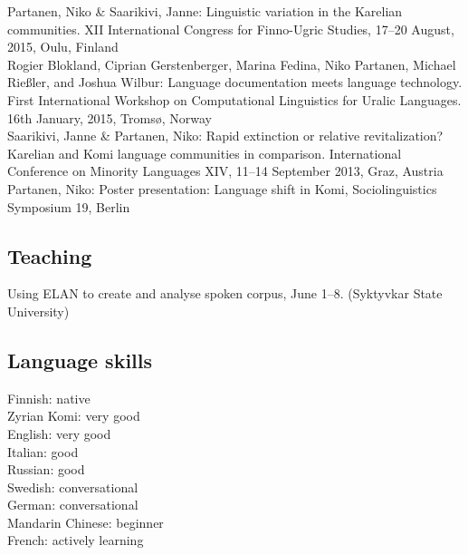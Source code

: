 \documentclass[11pt, a4paper]{article}
\newcommand{\years}[1]{\marginnote{\scriptsize #1}} %
\begin{document}
\years{2015} Partanen, Niko \& Saarikivi, Janne: Linguistic variation in the Karelian communities. XII International Congress for Finno-Ugric Studies, 17–20 August, 2015, Oulu, Finland\\

\years{2014} Rogier Blokland, Ciprian Gerstenberger, Marina Fedina, Niko Partanen, Michael Rießler, and Joshua Wilbur: Language documentation meets language technology. First International Workshop on Computational Linguistics for Uralic Languages. 16th January, 2015, Tromsø, Norway\\

\years{2013} Saarikivi, Janne \& Partanen, Niko: Rapid extinction or relative revitalization? Karelian and Komi language communities in comparison. International Conference on Minority Languages XIV, 11–14 September 2013, Graz, Austria\\ 

\years{2012}Partanen, Niko: Poster presentation: Language shift in Komi, Sociolinguistics Symposium 19, Berlin\\





\subsection*{Teaching}

\years{2017} Using ELAN to create and analyse spoken corpus, June 1--8. (Syktyvkar State University)


\subsection*{Language skills}

Finnish: native\\
Zyrian Komi: very good\\
English: very good\\
Italian: good\\
Russian: good\\
Swedish: conversational\\
German: conversational\\
Mandarin Chinese: beginner\\
French: actively learning\\
\end{document}
